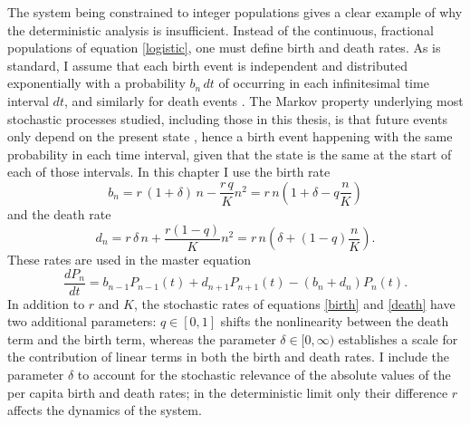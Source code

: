The system being constrained to integer populations gives a clear example of why the deterministic analysis is insufficient. 
Instead of the continuous, fractional populations of equation \ref{logistic}, one must define birth and death rates. 
As is standard, I assume that each birth event is independent and distributed exponentially with a probability $b_n\,dt$ of occurring in each infinitesimal time interval $dt$, and similarly for death events \cite{Nisbet1982,Gardiner2004a,VanKampen1992}. 
The Markov property underlying most stochastic processes studied, including those in this thesis, is that future events only depend on the present state \cite{Nisbet1982,Gardiner2004a,VanKampen1992}, hence a birth event happening with the same probability in each time interval, given that the state is the same at the start of each of those intervals. 
In this chapter I use the birth rate
\begin{equation}
b_n = r\,(1 + \delta)\,n - \frac{r\,q}{K}n^2 = r\,n\left(1+\delta-q\frac{n}{K}\right)
\label{birth}
\end{equation}
and the death rate
\begin{equation}
d_n = r\,\delta\,n + \frac{r(1-q)}{K} n^2 = r\,n\left(\delta+(1-q)\frac{n}{K}\right).
\label{death}
\end{equation}
These rates are used in the master equation
\begin{equation}
\frac{dP_n}{dt} =  b_{n-1}P_{n-1}(t) + d_{n+1}P_{n+1}(t) - (b_n+d_n)P_n(t).
\label{master-eqn}
\end{equation}
In addition to $r$ and $K$, the stochastic rates of equations \ref{birth} and \ref{death} have two additional parameters: $q\in[0,1]$ shifts the nonlinearity between the death term and the birth term, whereas the parameter $\delta\in[0,\infty)$ establishes a scale for the contribution of linear terms in both the birth and death rates. 
I include the parameter $\delta$ to account for the stochastic relevance of the absolute values of the per capita birth and death rates; in the deterministic limit only their difference $r$ affects the dynamics of the system. 
